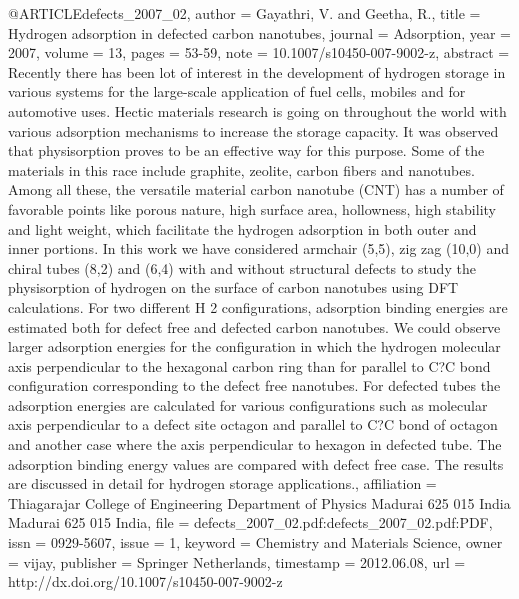 @ARTICLE{defects_2007_02,
  author = {Gayathri, V. and Geetha, R.},
  title = {Hydrogen adsorption in defected carbon nanotubes},
  journal = {Adsorption},
  year = {2007},
  volume = {13},
  pages = {53-59},
  note = {10.1007/s10450-007-9002-z},
  abstract = {Recently there has been lot of interest in the development of hydrogen
	storage in various systems for the large-scale application of fuel
	cells, mobiles and for automotive uses. Hectic materials research
	is going on throughout the world with various adsorption mechanisms
	to increase the storage capacity. It was observed that physisorption
	proves to be an effective way for this purpose. Some of the materials
	in this race include graphite, zeolite, carbon fibers and nanotubes.
	Among all these, the versatile material carbon nanotube (CNT) has
	a number of favorable points like porous nature, high surface area,
	hollowness, high stability and light weight, which facilitate the
	hydrogen adsorption in both outer and inner portions. In this work
	we have considered armchair (5,5), zig zag (10,0) and chiral tubes
	(8,2) and (6,4) with and without structural defects to study the
	physisorption of hydrogen on the surface of carbon nanotubes using
	DFT calculations. For two different H 2 configurations, adsorption
	binding energies are estimated both for defect free and defected
	carbon nanotubes. We could observe larger adsorption energies for
	the configuration in which the hydrogen molecular axis perpendicular
	to the hexagonal carbon ring than for parallel to C?C bond configuration
	corresponding to the defect free nanotubes. For defected tubes the
	adsorption energies are calculated for various configurations such
	as molecular axis perpendicular to a defect site octagon and parallel
	to C?C bond of octagon and another case where the axis perpendicular
	to hexagon in defected tube. The adsorption binding energy values
	are compared with defect free case. The results are discussed in
	detail for hydrogen storage applications.},
  affiliation = {Thiagarajar College of Engineering Department of Physics Madurai 625
	015 India Madurai 625 015 India},
  file = {defects_2007_02.pdf:defects_2007_02.pdf:PDF},
  issn = {0929-5607},
  issue = {1},
  keyword = {Chemistry and Materials Science},
  owner = {vijay},
  publisher = {Springer Netherlands},
  timestamp = {2012.06.08},
  url = {http://dx.doi.org/10.1007/s10450-007-9002-z}
}

